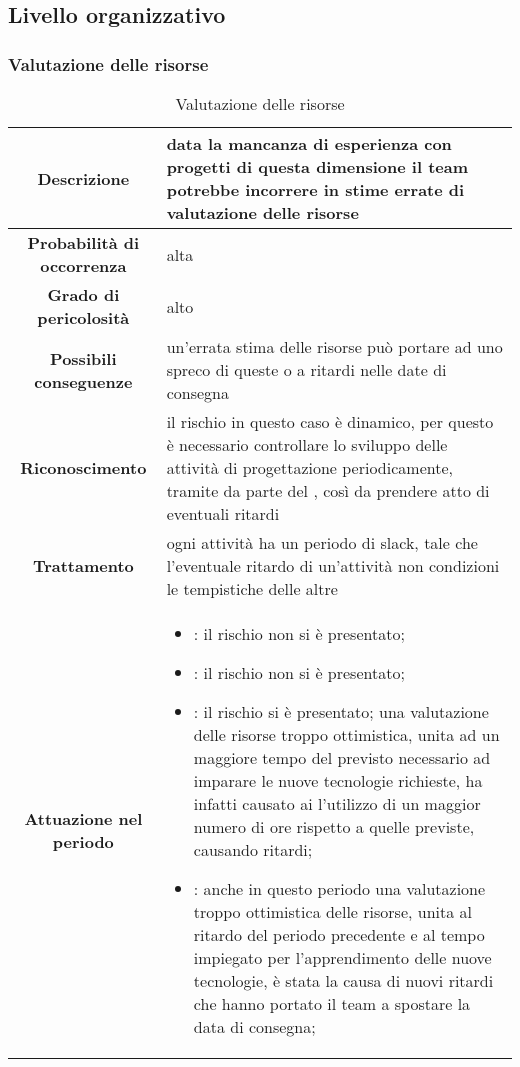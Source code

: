 \documentclass[PianoDiProgetto.tex]{subfiles}
\begin{document}
\clearpage		
	\subsection{Livello organizzativo}
	\subsubsection{Valutazione delle risorse}
		\label{sec:lo}
		
		
\begin{table}[h]
		\begin{center}
			\begin{tabular}{ | c | p{10cm} |}
				\hline		
		
		 \textbf{Descrizione} & data la mancanza di esperienza con progetti di questa dimensione il team potrebbe incorrere in stime errate di valutazione delle risorse \\ \hline
		 \textbf{Probabilità di occorrenza} & alta \\ \hline
		 \textbf{Grado di pericolosità} & alto \\ \hline
		 \textbf{Possibili conseguenze} & un'errata stima delle risorse può portare ad uno spreco di queste o a ritardi nelle date di consegna \\ \hline
		 \textbf{Riconoscimento} & il rischio in questo caso è dinamico, per questo è necessario controllare lo sviluppo delle attività di progettazione periodicamente, tramite  \gl{verifica} da parte del \RESP{}, così da prendere atto di eventuali ritardi \\ \hline
		 \textbf{Trattamento} & ogni attività ha un periodo di slack, tale che l'eventuale ritardo di un'attività non condizioni le tempistiche delle altre \\ \hline
		 \textbf{Attuazione nel periodo} &
			\begin{itemize}
				\item \PerAR : il rischio non si è presentato;
				\item \PerAD: il rischio non si è presentato;
				\item \PerPA: il rischio si è presentato; una valutazione delle risorse troppo ottimistica, unita ad un maggiore tempo del previsto necessario ad imparare le nuove tecnologie richieste, ha infatti causato ai \PJP l'utilizzo di un maggior numero di ore rispetto a quelle previste, causando ritardi;
				\item \PerPD: anche in questo periodo una valutazione troppo ottimistica delle risorse, unita al ritardo del periodo precedente e al tempo impiegato per l'apprendimento delle nuove tecnologie, è stata la causa di nuovi ritardi che hanno portato il team a spostare la data di consegna; 
			\end{itemize}
			\\ \hline
	
		\end{tabular}
		\caption{Valutazione delle risorse}
		\end{center}	
	\end{table}	
	
\end{document}
